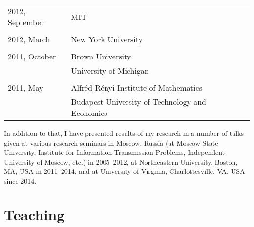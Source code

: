 \documentclass[letterpaper,11pt]{article}
\begin{document}
\begin{longtable}{llc}
  2012, September & MIT \\\\ 

  2012, March & New York University\\\\

  2011, October & Brown University \\
  &University of Michigan
  \\
	\\
  2011, May& Alfr\'ed R\'enyi Institute of Mathematics
  \\
  & Budapest University of Technology and Economics
  \\
\end{longtable}
\bigskip

In addition to that, I have presented results of my research in a number of talks given at various research seminars in Moscow, Russia (at Moscow State University, Institute for Information Transmission Problems, Independent University of Moscow, etc.) in 2005--2012, at Northeastern University, Boston, MA, USA in 2011--2014, and
at University of Virginia, Charlottesville, VA, USA since 2014.

\section*{Teaching}
\end{document}
